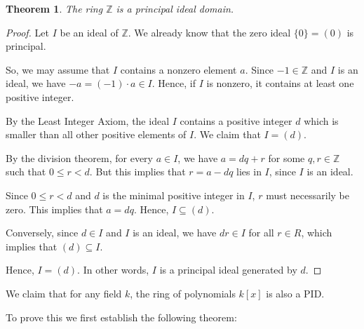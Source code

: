 \documentclass[a4paper,12pt]{report}
\newcounter{statement}
\numberwithin{statement}{chapter}
\newtheorem{thm}[statement]{Theorem}
\numberwithin{equation}{chapter}
\numberwithin{section}{chapter}
\numberwithin{subsection}{section}
\begin{document}
\begin{thm}

The ring $\mathbb{Z}$ is a principal ideal domain.
\end{thm}
\begin{proof}

Let $I$ be an ideal of $\mathbb{Z}$.
We already know that the zero ideal $\{0\} = (0)$ is principal.





So, we may assume that $I$ contains a nonzero element $a$.  Since $-1 \in \mathbb{Z}$ and $I$ is an ideal,
we have $-a = (-1)\cdot a \in I$.  Hence, if $I$ is nonzero, it contains at least one positive integer.





By the Least Integer Axiom, the ideal $I$ contains a positive integer $d$ which is smaller than all other
positive elements of $I$.  We claim that $I = (d)$.





By the division theorem, for every $a \in I$, we have $a = dq + r$ for some $q, r \in \mathbb{Z}$
such that $0 \leq r < d$.  But this implies that $r = a - dq$ lies in $I$,
since $I$ is an ideal.


Since $0 \leq r < d$ and $d$ is the minimal positive integer in $I$,
$r$ must necessarily be zero.
This implies that $a = dq$.  Hence, $I \subseteq (d)$.





Conversely, since $d \in I$ and $I$ is an ideal, we have $dr \in I$
for all $r \in R$, which implies that $(d) \subseteq I$.





Hence, $I = (d)$.  In other words, $I$ is a principal ideal generated by $d$.


\end{proof}




We claim that for any field $k$, the ring of polynomials
$k[x]$ is also a PID.



To prove this we first establish the following theorem:
\end{document}
